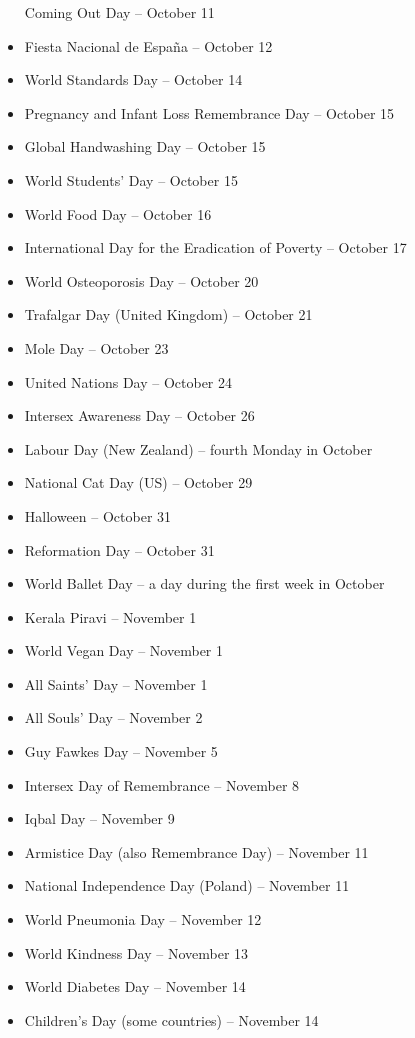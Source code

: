 \documentclass[
]{book}
\begin{document}
\begin{itemize}
  Coming Out Day -- October 11
\item
  Fiesta Nacional de España -- October 12
\item
  World Standards Day -- October 14
\item
  Pregnancy and Infant Loss Remembrance Day -- October 15
\item
  Global Handwashing Day -- October 15
\item
  World Students' Day -- October 15
\item
  World Food Day -- October 16
\item
  International Day for the Eradication of Poverty -- October 17
\item
  World Osteoporosis Day -- October 20
\item
  Trafalgar Day (United Kingdom) -- October 21
\item
  Mole Day -- October 23
\item
  United Nations Day -- October 24
\item
  Intersex Awareness Day -- October 26
\item
  Labour Day (New Zealand) -- fourth Monday in October
\item
  National Cat Day (US) -- October 29
\item
  Halloween -- October 31
\item
  Reformation Day -- October 31
\item
  World Ballet Day -- a day during the first week in October
\item
  Kerala Piravi -- November 1
\item
  World Vegan Day -- November 1
\item
  All Saints' Day -- November 1
\item
  All Souls' Day -- November 2
\item
  Guy Fawkes Day -- November 5
\item
  Intersex Day of Remembrance -- November 8
\item
  Iqbal Day -- November 9
\item
  Armistice Day (also Remembrance Day) -- November 11
\item
  National Independence Day (Poland) -- November 11
\item
  World Pneumonia Day -- November 12
\item
  World Kindness Day -- November 13
\item
  World Diabetes Day -- November 14
\item
  Children's Day (some countries) -- November 14

\end{itemize}
\end{document}
